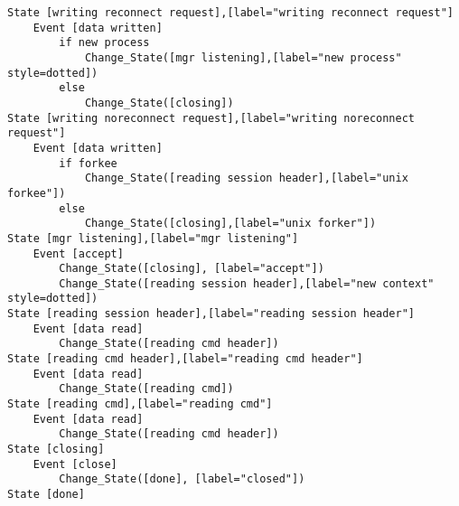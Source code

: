 \begin{verbatim}
State [writing reconnect request],[label="writing reconnect request"]
	Event [data written]
		if new process
			Change_State([mgr listening],[label="new process" style=dotted])
		else
			Change_State([closing])
State [writing noreconnect request],[label="writing noreconnect request"]
	Event [data written]
		if forkee
			Change_State([reading session header],[label="unix forkee"])
		else
			Change_State([closing],[label="unix forker"])
State [mgr listening],[label="mgr listening"]
	Event [accept]
		Change_State([closing], [label="accept"])
		Change_State([reading session header],[label="new context" style=dotted])
State [reading session header],[label="reading session header"]
	Event [data read]
		Change_State([reading cmd header])
State [reading cmd header],[label="reading cmd header"]
	Event [data read]
		Change_State([reading cmd])
State [reading cmd],[label="reading cmd"]
	Event [data read]
		Change_State([reading cmd header])
State [closing]
	Event [close]
		Change_State([done], [label="closed"])
State [done]
\end{verbatim}

